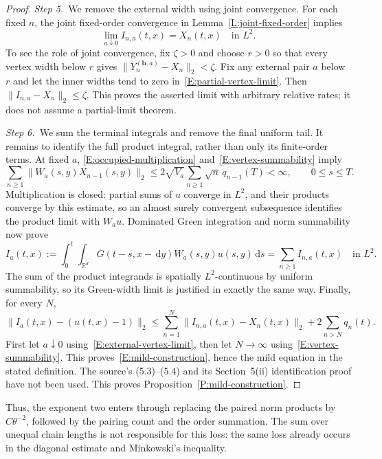 \documentclass[12pt,oneside,openany]{book}
\numberwithin{equation}{section}
\theoremstyle{nogostyle}
\theoremstyle{definition}
\newcommand{\R}{\mathbb{R}}
\newcommand{\ud}{\,\mathrm{d}}
\begin{document}
\begin{proof}
  \medskip
  \noindent\textit{Step 5.~}We remove the external width using joint
  convergence.
  For each fixed $n$, the joint fixed-order convergence in
  Lemma~\ref{L:joint-fixed-order} implies
  \begin{equation}\label{E:external-vertex-limit}
    \lim_{a\downarrow0}I_{n,a}(t,x)=X_n(t,x)\quad\text{in }L^2.
  \end{equation}
  To see the role of joint convergence, fix $\zeta > 0$ and choose $r > 0$ so
  that every vertex width below $r$ gives $\|Y_n^{(\boldsymbol b,a)}-X_n\|_2 <
  \zeta$. Fix any external pair $a$ below $r$ and let the inner widths tend to
  zero in~\eqref{E:partial-vertex-limit}. Then $\|I_{n,a}-X_n\|_2 \le \zeta$.
  This proves the asserted limit with arbitrary relative rates; it does not
  assume a partial-limit theorem.



  \medskip
  \noindent\textit{Step 6.~}We sum the terminal integrals and remove the final
  uniform tail.
  It remains to identify the full product integral, rather than only its
  finite-order terms. At fixed $a$, \eqref{E:occupied-multiplication}
  and~\eqref{E:vertex-summability} imply
  \[
    \sum_{n\ge1}\|W_a(s,y)X_{n-1}(s,y)\|_2
    \le2\sqrt{V_a}\sum_{n\ge1}\sqrt n\,q_{n-1}(T)<\infty,
    \qquad0\le s\le T.
  \]
  Multiplication is closed: partial sums of $u$ converge in $L^2$, and their
  products converge by this estimate, so an almost surely convergent subsequence
  identifies the product limit with $W_a u$. Dominated Green integration and
  norm summability now prove
  \[
    I_a(t,x):=\int_0^t\int_{\R^d}G(t-s,x-\ud y)
    W_a(s,y)u(s,y)\ud s
    =\sum_{n\ge1}I_{n,a}(t,x)\quad\text{in }L^2.
  \]
  The sum of the product integrands is spatially $L^2$-continuous by uniform
  summability, so its Green-width limit is justified in exactly the same way.
  Finally, for every $N$,
  \[
    \|I_a(t,x)-(u(t,x)-1)\|_2
    \le\sum_{n=1}^N\|I_{n,a}(t,x)-X_n(t,x)\|_2
    +2\sum_{n>N}q_n(t).
  \]
  First let $a\downarrow0$ using~\eqref{E:external-vertex-limit}, then let $N
  \to \infty$ using~\eqref{E:vertex-summability}. This
  proves~\eqref{E:mild-construction}, hence the mild equation in the stated
  definition. The source's (5.3)--(5.4) and its Section~5(ii) identification
  proof have not been used. This proves Proposition~\ref{P:mild-construction}.
\end{proof}

Thus, the exponent two enters through replacing the paired norm products by
$C\theta^{-2}$, followed by the pairing count and the order summation. The sum
over unequal chain lengths is not responsible for this loss: the same loss
already occurs in the diagonal estimate and Minkowski's inequality.
\end{document}
